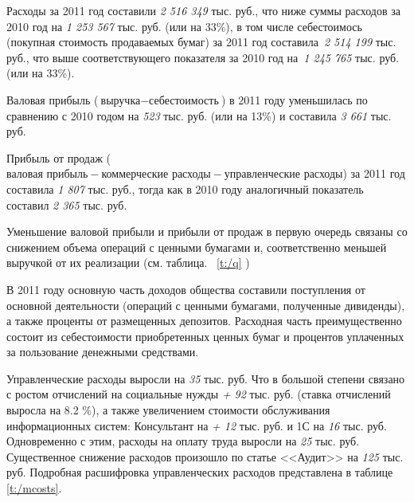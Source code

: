 \documentclass[a4paper,12pt]{scrreprt}
\begin{document}
Расходы за 2011 год составили \emph{2 516 349} тыс. руб., что ниже суммы расходов за 2010 год на \emph{1 253 567} тыс. руб. (или на 33\%), в том числе себестоимось (покупная стоимость продаваемых бумаг) за 2011 год составила~\emph{2 514 199} тыс. руб., что выше соответствующего показателя за 2010 год на~\emph{1 245 765} тыс. руб. (или на 33\%).

Валовая прибыль ($ \textit{выручка} - \textit{себестоимость} $) в 2011 году уменьшилась по сравнению с 2010 годом на \emph{523} тыс. руб. (или на 13\%) и составила \emph{3 661} тыс. руб.

Прибыль от продаж ($ \textit{валовая прибыль} - \textit{коммерческие расходы} - \textit{управленческие расходы} $) за 2011 год составила \emph{1 807} тыс. руб., тогда как в 2010 году аналогичный показатель составил \emph{2 365} тыс. руб.

Уменьшение валовой прибыли и прибыли от продаж в первую очередь связаны со  снижением объема операций с ценными бумагами и, соответственно меньшей выручкой от их реализации (см. таблица. ~\ref{t:/q} )

В 2011 году основную часть доходов общества составили поступления от основной деятельности (операций с ценными бумагами, полученные дивиденды), а также проценты от размещенных депозитов.
Расходная часть преимущественно состоит из себестоимости приобретенных ценных бумаг и процентов уплаченных за пользование денежными средствами. 



\vspace{0.5cm}

\normalsize
\rm

Управленческие расходы выросли на \emph{35} тыс. руб. Что в большой степени связано с ростом отчислений на социальные нужды \emph{+ 92} тыс. руб. (ставка отчислений выросла на 8.2 \%), а также увеличением стоимости обслуживания информационных систем: Консультант на \emph{+ 12} тыс. руб. и 1С на \emph{16} тыс. руб. Одновременно с этим, расходы на оплату труда выросли на \emph{25} тыс. руб. Существенное снижение расходов произошло по статье <<Аудит>> на \emph{125} тыс. руб. Подробная расшифровка управленческих расходов  представлена в таблице \ref{t:/mcosts}.

\vspace{-0.5cm}

\tablefont
\small
\end{document}
